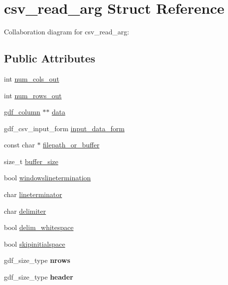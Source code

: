 \hypertarget{structcsv__read__arg}{}\section{csv\+\_\+read\+\_\+arg Struct Reference}
\label{structcsv__read__arg}


Collaboration diagram for csv\+\_\+read\+\_\+arg\+:
\subsection*{Public Attributes}
\begin{DoxyCompactItemize}
\item 
int \hyperlink{structcsv__read__arg_a14d86f0cfad2d55094fb5f43d27b7aee}{num\+\_\+cols\+\_\+out}
\item 
int \hyperlink{structcsv__read__arg_a0ee2696a9496af7b763950450d97004c}{num\+\_\+rows\+\_\+out}
\item 
\hyperlink{structgdf__column__}{gdf\+\_\+column} $\ast$$\ast$ \hyperlink{structcsv__read__arg_a07311a60d8ccd7dc263693b7ad47b6bd}{data}
\item 
gdf\+\_\+csv\+\_\+input\+\_\+form \hyperlink{structcsv__read__arg_adf3a23fd53fbf0417e372cbb5e9d90a7}{input\+\_\+data\+\_\+form}
\item 
const char $\ast$ \hyperlink{structcsv__read__arg_aa2c43a3229c5829188cc2f24f2699eaf}{filepath\+\_\+or\+\_\+buffer}
\item 
size\+\_\+t \hyperlink{structcsv__read__arg_af495562c6d61625c78bc981804ba7617}{buffer\+\_\+size}
\item 
bool \hyperlink{structcsv__read__arg_af8f4c1bf9130fe4b6aaa021ef5371767}{windowslinetermination}
\item 
char \hyperlink{structcsv__read__arg_adf76239d00694c506ceaaf3d45650bc7}{lineterminator}
\item 
char \hyperlink{structcsv__read__arg_a0a57c07fa15c344435a9e0c4922a4732}{delimiter}
\item 
bool \hyperlink{structcsv__read__arg_a4b7dc9783c0216f800f8fc8a4443bd17}{delim\+\_\+whitespace}
\item 
bool \hyperlink{structcsv__read__arg_af45abee5cdab1f0a42def17c9b9cea94}{skipinitialspace}
\item 
gdf\+\_\+size\+\_\+type {\bfseries nrows}\hypertarget{structcsv__read__arg_afbf29fc558795ffa304fe751095b3e68}{}\label{structcsv__read__arg_afbf29fc558795ffa304fe751095b3e68}

\item 
gdf\+\_\+size\+\_\+type {\bfseries header}\hypertarget{structcsv__read__arg_ae37aab1e0e93f475d83ccf3464edba95}{}\label{structcsv__read__arg_ae37aab1e0e93f475d83ccf3464edba95}


\end{DoxyCompactItemize}
